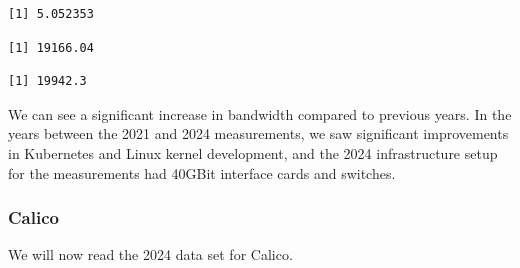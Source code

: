 \begin{Shaded}
\begin{Highlighting}[]
\SpecialCharTok{\$}
\end{Highlighting}
\end{Shaded}

\begin{verbatim}
[1] 5.052353
\end{verbatim}

\begin{Shaded}
\begin{Highlighting}[]
\SpecialCharTok{\$}
\end{Highlighting}
\end{Shaded}

\begin{verbatim}
[1] 19166.04
\end{verbatim}

\begin{Shaded}
\begin{Highlighting}[]
\SpecialCharTok{\$}
\end{Highlighting}
\end{Shaded}

\begin{verbatim}
[1] 19942.3
\end{verbatim}

We can see a significant increase in bandwidth compared to previous years. In the years between the 2021 and 2024 measurements, we saw significant improvements in Kubernetes and Linux kernel development, and the 2024 infrastructure setup for the measurements had 40GBit interface cards and switches.

\subsubsection{Calico}

We will now read the 2024 data set for Calico.

\begin{Shaded}
\begin{Highlighting}[]
\OtherTok{\textless{}{-}} 
\OtherTok{\textless{}{-}} \NormalTok{(}\NormalTok{,}\NormalTok{))}
\end{Highlighting}
\end{Shaded}

